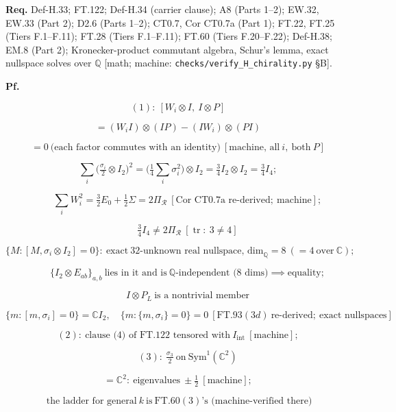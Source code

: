 \begin{theorem}
\textbf{Req.} Def-H.33; FT.122; Def-H.34 (carrier clause); A8 (Parts 1–2); EW.32, EW.33 (Part 2); D2.6 (Parts 1–2); CT0.7, Cor CT0.7a (Part 1); FT.22, FT.25 (Tiers F.1–F.11); FT.28 (Tiers F.1–F.11); FT.60 (Tiers F.20–F.22); Def-H.38; EM.8 (Part 2); Kronecker-product commutant algebra, Schur's lemma, exact nullspace solves over $\mathbb Q$ [math; machine: \texttt{checks/\allowbreak{}verify\_\allowbreak{}H\_\allowbreak{}chirality.py} §B].

\textbf{Pf.}

\[
(1):\ [W_i\otimes I,\ I\otimes P]
\]

\[
= (W_iI)\otimes(IP)-(IW_i)\otimes(PI)
\]

\[
= 0\ \text{(each factor commutes with an identity)}\ [\text{machine, all}\ i,\ \text{both}\ P]
\]

\[
\sum_i\bigl(\tfrac{\sigma_i}2\otimes I_2\bigr)^2=\bigl(\tfrac14\sum_i\sigma_i^2\bigr)\otimes I_2=\tfrac34I_2\otimes I_2=\tfrac34I_4;
\]

\[
\qquad \sum_iW_i^2=\tfrac32E_0+\tfrac12\Sigma=2\Pi_{\mathcal R}\ [\text{Cor CT0.7a re-derived};\ \text{machine}];
\]

\[
\qquad \tfrac34I_4\ne2\Pi_{\mathcal R}\ [\operatorname{tr}:\ 3\ne4]
\]

\[
\{M:[M,\sigma_i\otimes I_2]=0\}:\ \text{exact}\ 32\text{-unknown real nullspace, dim}_{\mathbb Q}=8\ (=4\ \text{over}\ \mathbb C);
\]

\[
\qquad \{I_2\otimes E_{ab}\}_{a,b}\ \text{lies in it and is}\ \mathbb Q\text{-independent (8 dims)}\implies\text{equality};
\]

\[
\qquad I\otimes P_L\ \text{is a nontrivial member}
\]

\[
\{m:[m,\sigma_i]=0\}=\mathbb CI_2,\quad\{m:\{m,\sigma_i\}=0\}=0\ [\mathrm{FT.93}(3d)\ \text{re-derived};\ \text{exact nullspaces}]
\]

\[
(2):\ \text{clause (4) of FT.122 tensored with}\ I_{\mathrm{int}}\ [\text{machine}];
\]

\[
\qquad (3):\ \tfrac{\sigma_3}2\ \text{on}\ \mathrm{Sym}^1(\mathbb C^2)
\]

\[
= \mathbb C^2:\ \text{eigenvalues}\ \pm\tfrac12\ [\text{machine}];
\]

\[
\ \text{the ladder for general}\ k\ \text{is}\ \mathrm{FT.60}(3)\text{'s (machine-verified there)}
\]


\end{theorem}
